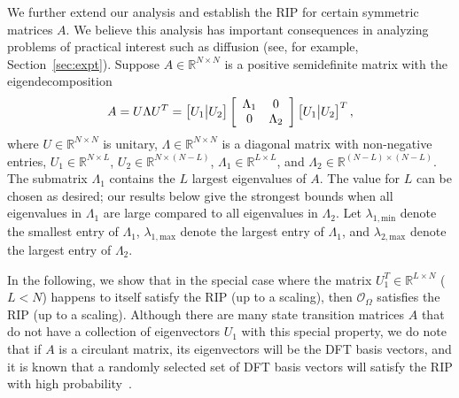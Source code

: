 \documentclass[11pt,draftcls,onecolumn]{IEEEtran}
\def\real    { \mathbb{R} }
\def \ok {{\mathcal{O}_{\Omega}}}
\def\real    { \mathbb{R} }
\begin{document}
We further extend our analysis and establish the \ac{RIP} for certain symmetric matrices $A$. We believe this analysis has important consequences in analyzing problems of practical interest such as 
diffusion (see, for example, Section~\ref{sec:expt}). Suppose $A \in \real^{N \times N}$ is a positive semidefinite matrix with the eigendecomposition
\begin{equation}
A = U\Lambda U^T=\left[U_1 \big{|} U_2\right]\left[\begin{array}{cc} \Lambda_{1} &0\\0& \Lambda_{2}\end{array} \right]\left[U_1 \big{|} U_2\right]^T,
\label{eq:decomp1}
\end{equation}
where $U \in \real^{N \times N}$ is unitary, $\Lambda \in \real^{N \times N}$ is a diagonal matrix with non-negative entries, $U_1 \in \real^{N \times L}$, $U_2 \in \real^{N \times \left(N-L\right)}$, $\Lambda_1 \in \real^{L \times L}$, and $\Lambda_2 \in \real^{\left(N-L\right) \times \left(N-L\right)}$.
The submatrix $\Lambda_1$ contains the $L$ largest eigenvalues of $A$.
The value for $L$ can be chosen as desired; our results below give the strongest bounds when all eigenvalues in $\Lambda_1$ are large compared to all eigenvalues in $\Lambda_2$.
Let $\lambda_{1,\text{min}}$ denote the smallest entry of $\Lambda_1$, $\lambda_{1,\text{max}}$ denote the largest entry of $\Lambda_1$,
and $\lambda_{2,\text{max}}$ denote the largest entry of $\Lambda_2$.

In the following, we show that in the special case where the matrix $U_1^T \in \real^{L \times N}$ ($L < N$) happens to itself satisfy the \ac{RIP} (up to a scaling), then $\ok$ satisfies the \ac{RIP} (up to a scaling). Although there are many state transition matrices $A$ that do not have a collection of eigenvectors $U_1$ with this special property, we do note that if $A$ is a circulant matrix, its eigenvectors will be the \ac{DFT} basis vectors, and it is known that a randomly selected set of \ac{DFT} basis vectors will satisfy the \ac{RIP} with high probability~\cite{rudelson2008sparse}.
\end{document}
